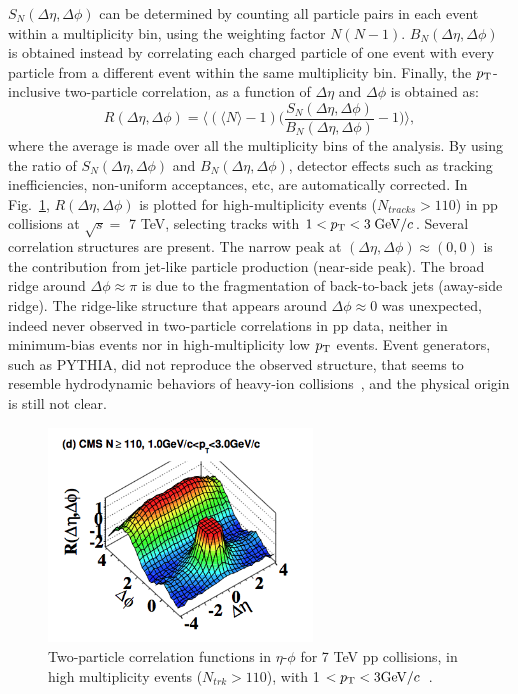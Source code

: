$S_N(\Delta \eta,\Delta \phi)$ can be determined by counting all particle pairs in each 
event within a multiplicity bin, using the weighting factor $N(N-1)$. $B_N(\Delta \eta,\Delta \phi)$ 
is obtained instead by correlating each charged particle of one event with every particle from 
a different event within the same multiplicity bin. Finally, the $p_{\rm T}$-inclusive two-particle 
correlation, as a function of $\Delta \eta$ and $\Delta \phi$ is obtained as:
\begin{equation}
\label{CorrelationFnc}
R(\Delta \eta,\Delta \phi) = \Big \langle (\langle N \rangle -1) \Big (\frac{S_N(\Delta \eta,\Delta \phi)}{B_N(\Delta \eta,\Delta \phi)} -1\Big )\Big \rangle,
\end{equation}
where the average is made over all the multiplicity bins of the analysis. 
\fi
By using the ratio of $S_N(\Delta \eta,\Delta \phi)$ and $B_N(\Delta \eta,\Delta \phi)$, 
detector effects such as tracking inefficiencies, non-uniform acceptances, etc, are 
automatically corrected. In Fig.~\ref{fig:CMSLongRangeRidge_pp7TeV}, $R(\Delta \eta,\Delta \phi)$ 
is plotted for high-multiplicity events ($N_{tracks} > 110$) in pp collisions at $\sqrt{s} = $ 7 TeV, 
selecting tracks with $1 <p_{\rm T} < 3\; \mathrm{GeV}/c$. Several correlation structures are present. 
The narrow peak at $(\Delta \eta, \Delta \phi) \approx (0,0)$ is the contribution 
from jet-like particle production (near-side peak). The broad ridge around $\Delta \phi \approx \pi$ 
is due to the fragmentation of back-to-back jets (away-side ridge). The ridge-like 
structure that appears around $\Delta \phi \approx 0$ was unexpected,
 indeed never observed in two-particle correlations in pp data, neither in minimum-bias 
 events nor in high-multiplicity low $p_{\rm T}$ events. Event generators, such as PYTHIA, did not reproduce the 
 observed structure, that seems to resemble hydrodynamic behaviors of heavy-ion 
 collisions~\cite{Alver:2008aa,Alver:2009id,Abelev:2009jv}, and the physical origin is still not clear.
\begin{figure}[!ht]
  \centering
  \includegraphics[width=7cm]{FigCap1/CMSLongRangeRidge_pp7TeV.png}
  \caption{Two-particle correlation functions in $\eta$-$\phi$ for 7 TeV pp collisions, in high multiplicity events ($N_{trk}>110$), with 1 $< p_{\rm T} < 3 \mathrm{GeV}/c$~\cite{Khachatryan:2010gv}.}
  \label{fig:CMSLongRangeRidge_pp7TeV}
\end{figure}
